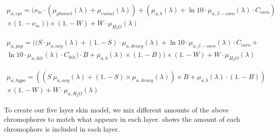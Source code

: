 \begin{equation}
\begin{split}
\mu_{a,epi}= (\nu_m \cdot (\mu_{phomel}(\lambda) + \mu_{eumel}(\lambda)) + (\mu_{a,b}(\lambda) + \ln10 \cdot \mu_{a,\beta-caro}(\lambda) \cdot C_{caro}) \\ \times (1. - \nu_m)) \times(1. - W) + W \cdot \mu_{H_2O}(\lambda)
\end{split}
\label{eqn:epiabs}
\end{equation}

\begin{equation}
\begin{split}
\mu_{a,pap}=((S \cdot \mu_{a,oxy}(\lambda) + (1. - S) \cdot \mu_{a,deoxy}(\lambda) + \ln10 \cdot \mu_{a,\beta-caro}(\lambda) \cdot C_{caro} + \\ \ln10 \cdot \mu_{a,bili}(\lambda)\cdot C_{bili})\cdot B + \mu_{a,b}(\lambda) \times (1. - B)) \times (1. - W) + W \cdot \mu_{H_2O}(\lambda)
\end{split}
\label{eqn:dermisabs}
\end{equation}

\begin{equation}
\begin{split}
\mu_{a,hypo}=((S\  \mu_{a,oxy}(\lambda) + (1. - S) \times \mu_{a,deoxy}(\lambda)) \times B + \mu_{a,b}(\lambda) \cdot (1. - B))\\ \times (1. - W) + W \cdot \mu_{a,H_2O}(\lambda)
\end{split}
\label{eqn:hypoabs}
\end{equation}


To create our five layer skin model, we mix different amounts of the above chromophores to match what appears in each layer.
 shows the amount of each chromophore is included in each layer.


